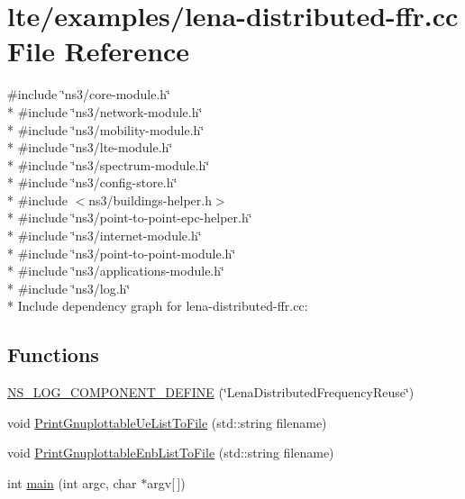 \hypertarget{lena-distributed-ffr_8cc}{}\section{lte/examples/lena-\/distributed-\/ffr.cc File Reference}
\label{lena-distributed-ffr_8cc}
{\ttfamily \#include \char`\"{}ns3/core-\/module.\+h\char`\"{}}\\*
{\ttfamily \#include \char`\"{}ns3/network-\/module.\+h\char`\"{}}\\*
{\ttfamily \#include \char`\"{}ns3/mobility-\/module.\+h\char`\"{}}\\*
{\ttfamily \#include \char`\"{}ns3/lte-\/module.\+h\char`\"{}}\\*
{\ttfamily \#include \char`\"{}ns3/spectrum-\/module.\+h\char`\"{}}\\*
{\ttfamily \#include \char`\"{}ns3/config-\/store.\+h\char`\"{}}\\*
{\ttfamily \#include $<$ns3/buildings-\/helper.\+h$>$}\\*
{\ttfamily \#include \char`\"{}ns3/point-\/to-\/point-\/epc-\/helper.\+h\char`\"{}}\\*
{\ttfamily \#include \char`\"{}ns3/internet-\/module.\+h\char`\"{}}\\*
{\ttfamily \#include \char`\"{}ns3/point-\/to-\/point-\/module.\+h\char`\"{}}\\*
{\ttfamily \#include \char`\"{}ns3/applications-\/module.\+h\char`\"{}}\\*
{\ttfamily \#include \char`\"{}ns3/log.\+h\char`\"{}}\\*
Include dependency graph for lena-\/distributed-\/ffr.cc\+:
\subsection*{Functions}
\begin{DoxyCompactItemize}
\item 
\hyperlink{lena-distributed-ffr_8cc_a3e616ca49b79ae674beb886178add22d}{N\+S\+\_\+\+L\+O\+G\+\_\+\+C\+O\+M\+P\+O\+N\+E\+N\+T\+\_\+\+D\+E\+F\+I\+NE} (\char`\"{}Lena\+Distributed\+Frequency\+Reuse\char`\"{})
\item 
void \hyperlink{lena-distributed-ffr_8cc_ad818a3dd4c090b8ecaba926e5272c409}{Print\+Gnuplottable\+Ue\+List\+To\+File} (std\+::string filename)
\item 
void \hyperlink{lena-distributed-ffr_8cc_a7e3aa5272ba032faa7717e0f3ba2f73d}{Print\+Gnuplottable\+Enb\+List\+To\+File} (std\+::string filename)
\item 
int \hyperlink{lena-distributed-ffr_8cc_a0ddf1224851353fc92bfbff6f499fa97}{main} (int argc, char $\ast$argv\mbox{[}$\,$\mbox{]})
\end{DoxyCompactItemize}


